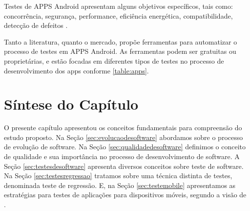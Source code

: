 Testes de \ac{APPS} Android apresentam alguns objetivos específicos, tais como: concorrência, segurança, performance, eficiência energética, compatibilidade, detecção de defeitos \cite{8453877}.

Tanto a literatura, quanto o mercado, propõe ferramentas para automatizar o processo de testes em \ac{APPS} Android. As ferramentas podem ser gratuitas ou proprietárias, e estão focadas em diferentes tipos de testes no processo de desenvolvimento dos apps conforme \ref{table:apps}.

\section{Síntese do Capítulo}\label{sec:sintesecapitulo}

O presente capítulo apresentou os conceitos fundamentais para compreensão do estudo proposto. Na Seção \ref{sec:evolucaodesoftware} abordamos sobre o processo de evolução de software. Na Seção \ref{sec:qualidadedesoftware} definimos o conceito de qualidade e sua importância no processo de desenvolvimento de software. A Seção \ref{sec:testesdesoftware} apresenta diversos conceitos sobre teste de software. Na Seção \ref{sec:testesregressao} tratamos sobre uma técnica distinta de testes, denominada teste de regressão. E, na Seção \ref{sec:testemobile} apresentamos as estratégias para testes de aplicações para dispositivos móveis, segundo a visão de .